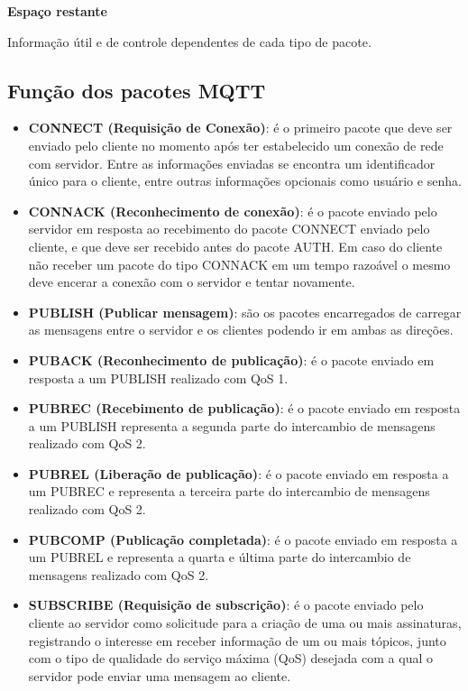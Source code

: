 \documentclass[12pt, a4paper]{article}
\begin{document}
\textbf{Espaço restante}

Informação útil e de controle dependentes de cada tipo de pacote.

\cleardoublepage

\subsection{Função dos pacotes MQTT}

\begin{itemize}
    \item \textbf{CONNECT (Requisição de Conexão)}: é o primeiro pacote que deve ser enviado pelo cliente no momento após ter estabelecido um conexão de rede com servidor. Entre as informações enviadas se encontra um identificador único para o cliente, entre outras informações opcionais como usuário e senha.
    \item \textbf{CONNACK (Reconhecimento de conexão)}: é o pacote enviado pelo servidor em resposta ao recebimento do pacote CONNECT enviado pelo cliente, e que deve ser recebido antes do pacote AUTH. Em caso do cliente não receber um pacote do tipo CONNACK em um tempo razoável o mesmo deve encerar a conexão com o servidor e tentar novamente.
    \item \textbf{PUBLISH (Publicar mensagem)}: são os pacotes encarregados de carregar as mensagens entre o servidor e os clientes podendo ir em ambas as direções.
    \item \textbf{PUBACK (Reconhecimento de publicação)}: é o pacote enviado em resposta a um PUBLISH realizado com QoS 1.
    \item \textbf{PUBREC (Recebimento de publicação)}: é o pacote enviado em resposta a um PUBLISH representa a segunda parte do intercambio de mensagens realizado com QoS 2.
    \item \textbf{PUBREL (Liberação de publicação)}: é o pacote enviado em resposta a um PUBREC e representa a terceira parte do intercambio de mensagens realizado com QoS 2.
    \item \textbf{PUBCOMP (Publicação completada)}: é o pacote enviado em resposta a um PUBREL e representa a quarta e última parte do intercambio de mensagens realizado com QoS 2.
    \item \textbf{SUBSCRIBE (Requisição de subscrição)}: é o pacote enviado pelo cliente ao servidor como solicitude para a criação de uma ou mais assinaturas, registrando o interesse em receber informação de um ou mais tópicos, junto com o tipo de qualidade do serviço máxima (QoS) desejada com a qual o servidor pode enviar uma mensagem ao cliente.

\end{itemize}
\end{document}

